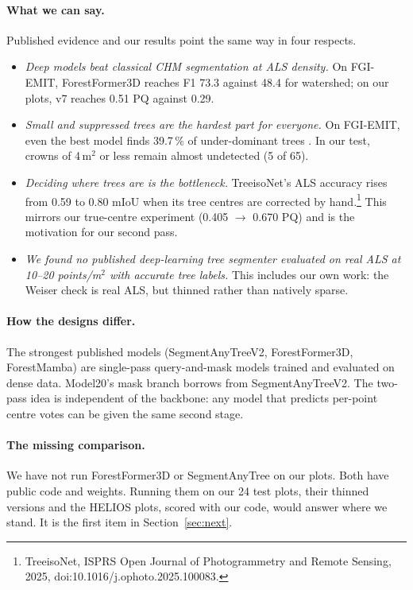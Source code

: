 \documentclass[11pt,a4paper]{article}
\newcommand{\sqm}{m$^2$}
\newcommand{\ppsm}{points/m$^2$}
\begin{document}
\paragraph{What we can say.} Published evidence and our results point the same way in four respects.
\begin{itemize}
  \item \emph{Deep models beat classical CHM segmentation at ALS density.} On FGI-EMIT, ForestFormer3D reaches F1 73.3 against 48.4 for watershed; on our plots, v7 reaches 0.51 PQ against 0.29.
  \item \emph{Small and suppressed trees are the hardest part for everyone.} On FGI-EMIT, even the best model finds 39.7\,\% of under-dominant trees \citep{ruoppa2025fgiemit}. In our test, crowns of 4\,\sqm{} or less remain almost undetected (5 of 65).
  \item \emph{Deciding where trees are is the bottleneck.} TreeisoNet's ALS accuracy rises from 0.59 to 0.80 mIoU when its tree centres are corrected by hand.\footnote{TreeisoNet, ISPRS Open Journal of Photogrammetry and Remote Sensing, 2025, doi:10.1016/j.ophoto.2025.100083.} This mirrors our true-centre experiment (0.405 $\to$ 0.670 PQ) and is the motivation for our second pass.
  \item \emph{We found no published deep-learning tree segmenter evaluated on real ALS at 10--20 \ppsm{} with accurate tree labels.} This includes our own work: the Weiser check is real ALS, but thinned rather than natively sparse.
\end{itemize}

\paragraph{How the designs differ.} The strongest published models (SegmentAnyTreeV2, ForestFormer3D, ForestMamba) are single-pass query-and-mask models trained and evaluated on dense data. Model20's mask branch borrows from SegmentAnyTreeV2. The two-pass idea is independent of the backbone: any model that predicts per-point centre votes can be given the same second stage.

\paragraph{The missing comparison.} We have not run ForestFormer3D or SegmentAnyTree on our plots. Both have public code and weights. Running them on our 24 test plots, their thinned versions and the HELIOS plots, scored with our code, would answer where we stand. It is the first item in Section~\ref{sec:next}.
\end{document}
